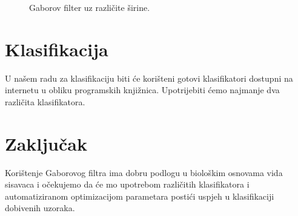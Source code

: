 \documentclass{article}
\begin{document}
\begin{figure}[htb]
  \centering
  \hspace{50pt}
  \caption{Gaborov filter uz različite širine.}
  \label{fig:filter-bandwidths}
\end{figure}

\section{Klasifikacija}

U našem radu za klasifikaciju biti će korišteni gotovi klasifikatori dostupni na internetu u obliku programskih knjižnica. Upotrijebiti ćemo najmanje dva različita klasifikatora.

\section{Zaključak}

Korištenje Gaborovog filtra ima dobru podlogu u biološkim osnovama vida
sisavaca i očekujemo da će mo upotrebom različitih klasifikatora i
automatiziranom optimizacijom parametara postići uspjeh u klasifikaciji
dobivenih uzoraka.



\end{document}
